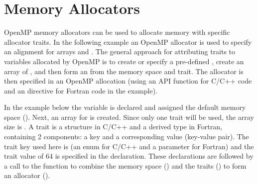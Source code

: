 \section{Memory Allocators}
\label{sec:allocators}





OpenMP memory allocators can be used to allocate memory with
specific allocator traits.  In the following example an OpenMP allocator is used to
specify an alignment for arrays  and . The
general approach for attributing traits to variables allocated by
OpenMP is to create or specify a pre-defined , create an
array of , and then form an  from the
memory space and trait.
The allocator is then specified
in an OpenMP allocation (using an API  function
for C/C++ code and an  directive for Fortran code
in the  example).

In the example below the  variable is declared
and assigned the default memory space ().
Next, an array for  is created. Since only one
trait will be used, the array size is .
A trait is a structure in C/C++ and a derived type in Fortran,
containing 2 components: a key and a corresponding value (key-value pair).
The trait key used here is  (an enum for C/C++
and a parameter for Fortran)
and the trait value of 64 is specified in the  declaration.
These declarations are followed by a call to the
 function to combine the memory
space () and the traits ()
to form an allocator ().

